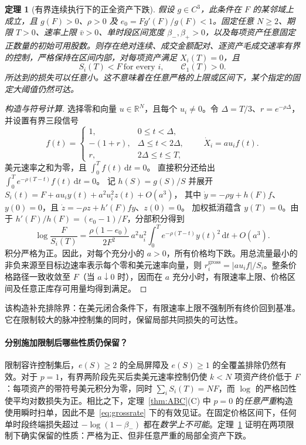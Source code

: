 \documentclass[11pt]{article}
\numberwithin{equation}{section}
\newtheorem{theorem}{定理}[section]
\theoremstyle{definition}
\theoremstyle{remark}
\newcommand{\R}{\mathbb{R}}
\newcommand{\dd}{\,\mathrm{d}}
\begin{document}
\begin{theorem}[有界连续执行下的正全资产下跌]\label{thm:finite-rate-construct}
假设 $g\in C^3$，此条件在 $F$ 的某邻域上成立，且 $g(F)>0$、$\rho>0$ 及 $e_0=Fg'(F)/g(F)<1$。固定\emph{任意} $N\ge2$、期限 $T>0$、速率上限 $\bar v>0$、单时段区间宽度 $\beta_-,\beta_+>0$，以及每项资产任意固定正数量的初始可用股数。则存在\emph{绝对连续}、成交金额配对、逐资产毛成交速率有界的控制，严格保持在区间内部，对每项资产满足 $X_i(T)=0$，且
\begin{equation}\label{eq:local-speed-crash}
 \boxed{\ S_i(T)<F\ \text{for every }i,\qquad \mathcal C_1(T)>0.\ }
\end{equation}
所达到的损失可以任意小。这\emph{不}意味着在任意严格的上限或区间下，某个指定的固定大阈值仍然可达。
\end{theorem}
\begin{proof}[构造与符号计算]
选择零和向量 $u\in\R^N$，且每个 $u_i\ne0$。令 $\Delta=T/3$、$r=e^{-\rho\Delta}$，并设置有界三段信号
\begin{equation}\label{eq:bounded-control}
 f(t)=
 \begin{cases}
 1,&0\le t<\Delta,\\
 -(1+r),&\Delta\le t<2\Delta,\\
 r,&2\Delta\le t\le T,
 \end{cases}
 \qquad \dot X_i=a u_i f(t).
\end{equation}
美元速率之和为零，且 $\int_0^T f(t)\dd t=0$。
直接积分还给出 $\int_0^T e^{-\rho(T-t)}f(t)\dd t=0$。
记 $h(S)=g(S)/S$ 并展开
$S_i(t)=F+a u_i y(t)+a^2u_i^2 z(t)+O(a^3)$，
其中 $\dot y=-\rho y+h(F)f$、$y(0)=0$，且
$\dot z=-\rho z+h'(F)f y$、$z(0)=0$。
加权抵消蕴含 $y(T)=0$。由于 $h'(F)/h(F)=(e_0-1)/F$，分部积分得到
\begin{equation}\label{eq:finite-rate-coefficient}
 \boxed{\ \log\frac{F}{S_i(T)}=
 \frac{\rho(1-e_0)}{2F^2}\,a^2u_i^2
 \int_0^T e^{-\rho(T-t)}y(t)^2\dd t+O(a^3).\ }
\end{equation}
积分严格为正。因此，对每个充分小的 $a>0$，所有价格均下跌。用总流量最小的非负来源至目标边速率表示每个零和美元速率向量，则 $r_i^{\mathrm{gross}}=|a u_i f|/S_i$。整条价格路径一致收敛至 $F$（当 $a\downarrow0$ 时），因而在 $a$ 充分小时，有限速率上限、价格区间及任意正库存可用量均得到满足。
\end{proof}

该构造补充排除界：在美元闭合条件下，有限速率上限不强制所有终价回到基准。它在限制较大的脉冲控制集的同时，保留局部共同损失的可达性。

\paragraph{分别施加限制后哪些性质仍保留？}
限制容许控制集后，$e(S)\ge2$ 的全局屏障及 $e(S)\ge1$ 的全覆盖排除仍然有效。对于 $p=1$，有界两阶段先买后卖美元速率控制仍使 $k<N$ 项资产终价低于 $F$：每项资产的带符号美元积分为零，同时 $\sum_i S_i(T)=NF$，而 $\log$ 的严格凹性使平均对数损失为正。相比之下，定理~\ref{thm:ABC}(C) 中 $p=0$ 的\emph{任意严重}构造使用瞬时扫单，因此不是~\eqref{eq:grossrate} 下的有效见证。在固定价格区间下，任何单时段终端损失超过 $-\log(1-\beta_-)$ 都在\emph{数学上不可能}。定理~\ref{thm:finite-rate-construct} 证明在两项限制下确实保留的性质：严格为正、但非任意严重的局部全资产下跌。
\end{document}
